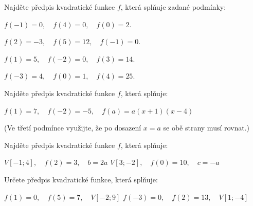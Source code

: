 \documentclass[12pt,a4paper]{article}
\begin{document}
\begin{exercise}
Najděte předpis kvadratické funkce \(f\), která splňuje zadané podmínky:

\begin{tasks}

\task $ f(-1) = 0,\quad f(4) = 0,\quad f(0) = 2.$

\task $ f(2) = -3,\quad f(5) = 12,\quad f(-1) = 0.$

\task $ f(1) = 5,\quad f(-2) = 0,\quad f(3) = 14.$

\task $ f(-3)=4,\quad f(0)=1,\quad f(4)=25.$

\end{tasks}

\end{exercise}



\begin{exercise}
Najděte předpis kvadratické funkce \(f\), která splňuje:

\begin{tasks}
\task $f(1) = 7,\quad f(-2) = -5,\quad f(a) = a(x+1)(x-4)$
\end{tasks}

(Ve třetí podmínce využijte, že po dosazení $x=a$ se obě strany musí rovnat.)
\end{exercise}

\begin{exercise}
Najděte předpis kvadratické funkce \(f\), která splňuje:

\begin{tasks}
\task $V[-1;4],\quad f(2)=3,\quad b = 2a$
\task $V[3;-2],\quad f(0)=10,\quad c = -a$
\end{tasks}
\end{exercise}

\begin{exercise}
Určete předpis kvadratické funkce, která splňuje:

\begin{tasks}
\task $f(1)=0,\quad f(5)=7,\quad V[-2;9]$
\task $f(-3)=0,\quad f(2)=13,\quad V[1;-4]$
\end{tasks}
\end{exercise}
\end{document}
